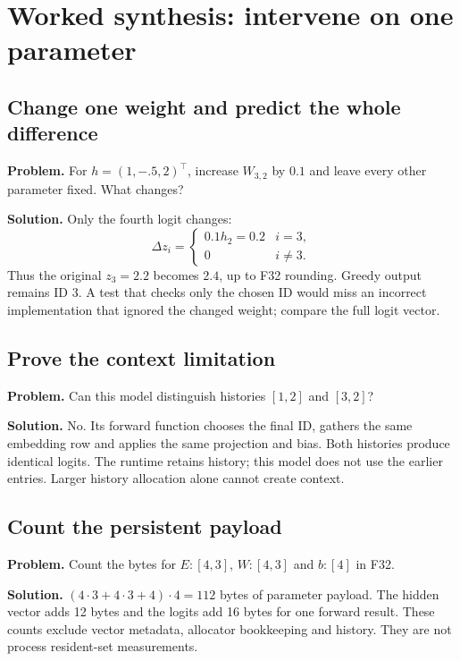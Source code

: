 \clearpage
\section{Worked synthesis: intervene on one parameter}
\subsection{Change one weight and predict the whole difference}
\textbf{Problem.} For $h=(1,-.5,2)^\top$, increase $W_{3,2}$ by $0.1$ and
leave every other parameter fixed. What changes?

\textbf{Solution.} Only the fourth logit changes:
\begin{equation}
\Delta z_i=\begin{cases}0.1h_2=0.2&i=3,\\0&i\ne3.\end{cases}
\end{equation}
Thus the original $z_3=2.2$ becomes $2.4$, up to F32 rounding. Greedy output
remains ID 3. A test that checks only the chosen ID would miss an incorrect
implementation that ignored the changed weight; compare the full logit vector.

\subsection{Prove the context limitation}
\textbf{Problem.} Can this model distinguish histories $[1,2]$ and $[3,2]$?

\textbf{Solution.} No. Its forward function chooses the final ID, gathers the
same embedding row and applies the same projection and bias. Both histories
produce identical logits. The runtime retains history; this model does not
use the earlier entries. Larger history allocation alone cannot create context.

\subsection{Count the persistent payload}
\textbf{Problem.} Count the bytes for $E:[4,3]$, $W:[4,3]$ and $b:[4]$ in F32.

\textbf{Solution.} $(4\cdot3+4\cdot3+4)\cdot4=112$ bytes of parameter payload.
The hidden vector adds 12 bytes and the logits add 16 bytes for one forward
result. These counts exclude vector metadata, allocator bookkeeping and history.
They are not process resident-set measurements.
